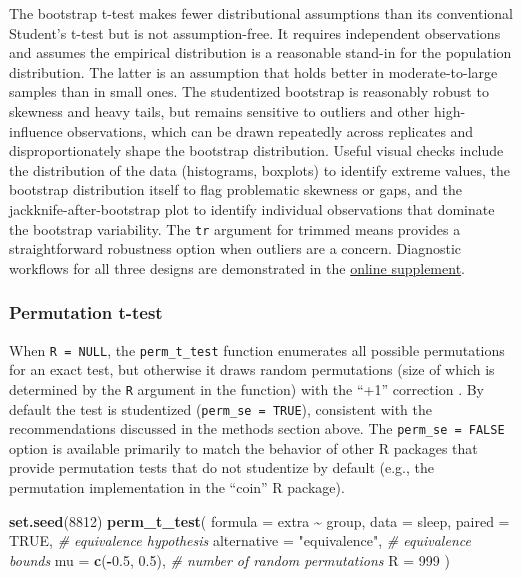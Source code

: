 \documentclass[]{interact}
\theoremstyle{plain}%
\theoremstyle{definition}
\theoremstyle{remark}
\newenvironment{Shaded}{\begin{snugshade}}{\end{snugshade}}
\newcommand{\AttributeTok}[1]{\textcolor[rgb]{0.13,0.29,0.53}{#1}}
\newcommand{\CommentTok}[1]{\textcolor[rgb]{0.56,0.35,0.01}{\textit{#1}}}
\newcommand{\ConstantTok}[1]{\textcolor[rgb]{0.56,0.35,0.01}{#1}}
\newcommand{\DecValTok}[1]{\textcolor[rgb]{0.00,0.00,0.81}{#1}}
\newcommand{\FloatTok}[1]{\textcolor[rgb]{0.00,0.00,0.81}{#1}}
\newcommand{\FunctionTok}[1]{\textcolor[rgb]{0.13,0.29,0.53}{\textbf{#1}}}
\newcommand{\NormalTok}[1]{#1}
\newcommand{\SpecialCharTok}[1]{\textcolor[rgb]{0.81,0.36,0.00}{\textbf{#1}}}
\newcommand{\StringTok}[1]{\textcolor[rgb]{0.31,0.60,0.02}{#1}}
\begin{document}
The bootstrap t-test makes fewer distributional assumptions than its
conventional Student's t-test but is not assumption-free. It requires
independent observations and assumes the empirical distribution is a
reasonable stand-in for the population distribution. The latter is an
assumption that holds better in moderate-to-large samples than in small
ones. The studentized bootstrap is reasonably robust to skewness and
heavy tails, but remains sensitive to outliers and other high-influence
observations, which can be drawn repeatedly across replicates and
disproportionately shape the bootstrap distribution. Useful visual
checks include the distribution of the data (histograms, boxplots) to
identify extreme values, the bootstrap distribution itself to flag
problematic skewness or gaps, and the jackknife-after-bootstrap plot to
identify individual observations that dominate the bootstrap
variability. The \texttt{tr} argument for trimmed means provides a
straightforward robustness option when outliers are a concern.
Diagnostic workflows for all three designs are demonstrated in the
\href{https://doi.org/10.5281/zenodo.22776188}{online supplement}.

\subsubsection{Permutation t-test}\label{permutation-t-test}

When \texttt{R\ =\ NULL}, the \texttt{perm\_t\_test} function enumerates
all possible permutations for an exact test, but otherwise it draws
random permutations (size of which is determined by the \texttt{R}
argument in the function) with the ``+1'' correction
\citep{phipson2010}. By default the test is studentized
(\texttt{perm\_se\ =\ TRUE}), consistent with the recommendations
discussed in the methods section above. The \texttt{perm\_se\ =\ FALSE}
option is available primarily to match the behavior of other R packages
that provide permutation tests that do not studentize by default (e.g.,
the permutation implementation in the ``coin'' R package).

\begin{Shaded}
\begin{Highlighting}[]
\FunctionTok{set.seed}\NormalTok{(}\DecValTok{8812}\NormalTok{)}
\FunctionTok{perm\_t\_test}\NormalTok{(}
  \AttributeTok{formula =}\NormalTok{ extra }\SpecialCharTok{\textasciitilde{}}\NormalTok{ group,}
  \AttributeTok{data =}\NormalTok{ sleep,}
  \AttributeTok{paired =} \ConstantTok{TRUE}\NormalTok{,}
  \CommentTok{\# equivalence hypothesis}
  \AttributeTok{alternative =} \StringTok{"equivalence"}\NormalTok{,}
  \CommentTok{\# equivalence bounds}
  \AttributeTok{mu =} \FunctionTok{c}\NormalTok{(}\SpecialCharTok{{-}}\FloatTok{0.5}\NormalTok{, }\FloatTok{0.5}\NormalTok{),}
  \CommentTok{\# number of random permutations}
  \AttributeTok{R =} \DecValTok{999}
\NormalTok{)}
\end{Highlighting}
\end{Shaded}
\end{document}
